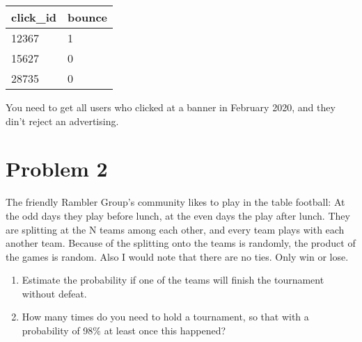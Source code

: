 \documentclass[14pt, a4paper]{extarticle}
\begin{document}
\begin{table}[h]
	\begin{tabular}{|l|l|}
		\hline
		click\_id & bounce	\\ \hline
		12367 	  & 1       \\ \hline
		15627 	  & 0       \\ \hline
		28735     & 0		\\ \hline	
	\end{tabular}
\end{table}

\noindent
You need to get all users who clicked at a banner in February 2020, and 
they din't reject an advertising.

\newpage

\section*{Problem 2}
%

The friendly Rambler Group's community likes to play in the table football: 
At the odd days they play before lunch, at the even days the play after lunch.
They are splitting at the N teams among each other, and every team plays with each another team.
Because of the splitting onto the teams is randomly, the product of the games is random.
Also I would note that there are no ties. Only win or lose.
\begin{enumerate}
	\item Estimate the probability if one of the teams will finish the tournament without defeat.
	\item How many times do you need to hold a tournament, so that with a probability of 98\% at least once this happened?
\end{enumerate} 
\end{document}
